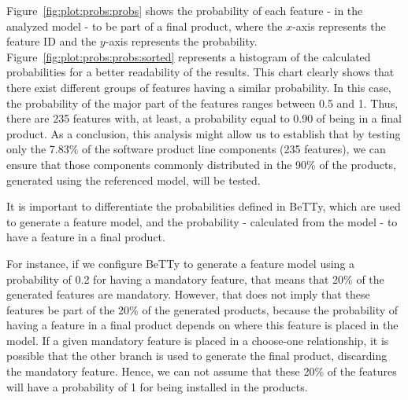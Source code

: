 Figure~\ref{fig:plot:probs:probs} shows the probability of each feature - in the analyzed model - to
be part of a final product, where the $x$-axis
represents the feature ID and the $y$-axis represents the probability.
Figure~\ref{fig:plot:probs:probs:sorted} represents a histogram of the calculated probabilities for a better
readability of the results. This chart clearly shows that there exist
different groups of features having a similar probability.
In this case, the probability of the major part
of the features ranges between 0.5 and 1.
%
Thus, there are 235 features with, at least, a probability equal to 0.90 of being in a final product.
As a conclusion, this analysis might allow us to establish that by testing only
the 7.83\% of the software product line components (235 features), we can ensure that those components commonly distributed in the 90\% of the products, generated using the referenced model, will be tested.

It is important to differentiate the probabilities defined in BeTTy, which are used to generate a
feature model, and the probability - calculated from the model - to have a feature in a final
product.

For instance, if we configure BeTTy to generate a feature model using a probability
of 0.2 for having a mandatory feature, that means that 20\% of the generated features are mandatory.
However, that does not imply that these features be part of the 20\% of the generated products, because
the probability of having a feature in a final product depends on where this feature is placed in the
model. If a given mandatory feature is placed in a choose-one relationship, it is possible that
the other branch is used to generate the final product, discarding the mandatory feature.
Hence, we can not assume that these 20\% of the features will have a probability of 1 for being
installed in the products.



